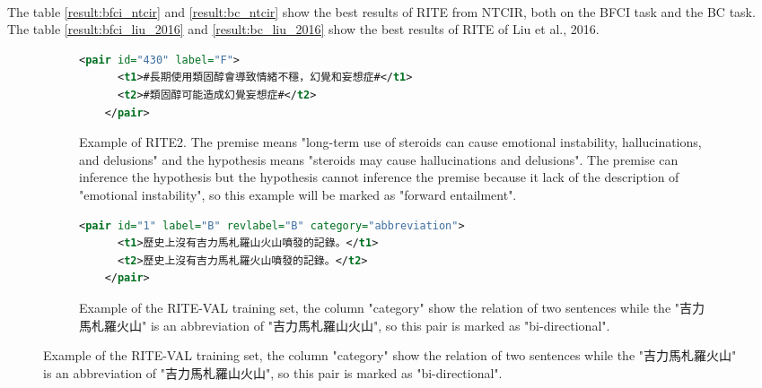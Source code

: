 \documentclass[12pt]{article}
\begin{document}
\begin{CJK*}{UTF8}{bkai}
\begin{spacing}{1.77}
\paragraph{}
The table \ref{result:bfci_ntcir} and \ref{result:bc_ntcir} show the best results of RITE from NTCIR, both on the BFCI task and the BC task. The table \ref{result:bfci_liu_2016} and \ref{result:bc_liu_2016} show the best results of RITE of Liu et al., 2016.

\begin{figure}[ht!]
  \centering
  \caption{The examples of RITE2 and RITE-VAL}
  \begin{subfigure}{1\linewidth}
    \caption{Example of RITE2. The premise means "long-term use of steroids can cause emotional instability, hallucinations, and delusions" and the hypothesis means "steroids may cause hallucinations and delusions". The premise can inference the hypothesis but the hypothesis cannot inference the premise because it lack of the description of "emotional instability", so this example will be marked as "forward entailment".}
    \begin{minipage}{\linewidth}
    \begin{lstlisting}[language=XML]
    <pair id="430" label="F">
      <t1>#長期使用類固醇會導致情緒不穩，幻覺和妄想症#</t1>
      <t2>#類固醇可能造成幻覺妄想症#</t2>
    </pair>
    \end{lstlisting}
    \end{minipage}
  \end{subfigure}

  \begin{subfigure}{1\linewidth}
    \caption{Example of the RITE-VAL training set, the column "category" show the relation of two sentences while the "吉力馬札羅火山" is an abbreviation of "吉力馬札羅山火山", so this pair is marked as "bi-directional".}
    \begin{minipage}{\linewidth}
    \begin{lstlisting}[language=XML]
    <pair id="1" label="B" revlabel="B" category="abbreviation">
      <t1>歷史上沒有吉力馬札羅山火山噴發的記錄。</t1>
      <t2>歷史上沒有吉力馬札羅火山噴發的記錄。</t2>
    </pair>
    \end{lstlisting}
    \end{minipage}
  \end{subfigure}
\end{figure}



\end{spacing}
\end{CJK*}
\end{document}
